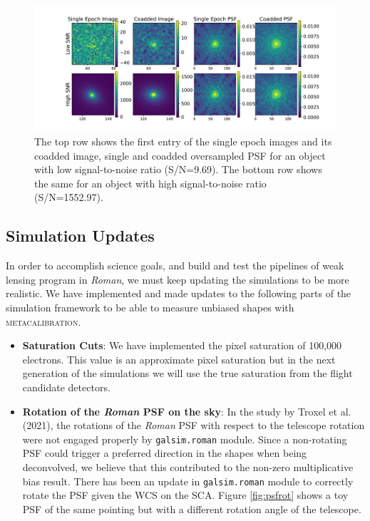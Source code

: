{\begin{figure}
	\includegraphics[width=\textwidth]{figure2.pdf}
	\vspace*{-10mm}
    \caption{The top row shows the first entry of the single epoch images and its coadded image, single and coadded oversampled PSF for an object with low signal-to-noise ratio (S/N=9.69). The bottom row shows the same for an object with high signal-to-noise ratio (S/N=1552.97).}
    \label{fig:singlecoadd}
\end{figure}


\subsection{Simulation Updates}
In order to accomplish science goals, and build and test the pipelines of weak lensing program in \emph{Roman}, we must keep updating the simulations to be more realistic. We have implemented and made updates to the following parts of the simulation framework to be able to measure unbiased shapes with \textsc{metacalibration}. 
\begin{itemize}
    \setlength\itemsep{1em}
    \item \textbf{Saturation Cuts}:
    We have implemented the pixel saturation of 100,000 electrons. This value is an approximate pixel saturation but in the next generation of the simulations we will use the true saturation from the flight candidate detectors. 
    
    \item \textbf{Rotation of the \emph{Roman} PSF on the sky}:
    In the study by Troxel et al. (2021), the rotations of the \emph{Roman} PSF with respect to the telescope rotation were not engaged properly by \texttt{galsim.roman} module. Since a non-rotating PSF could trigger a preferred direction in the shapes when being deconvolved, we believe that this contributed to the non-zero multiplicative bias result. There has been an update in \texttt{galsim.roman} module to correctly rotate the PSF given the WCS on the SCA. Figure \ref{fig:psfrot} shows a toy PSF of the same pointing but with a different rotation angle of the telescope. 
    

\end{itemize}}
